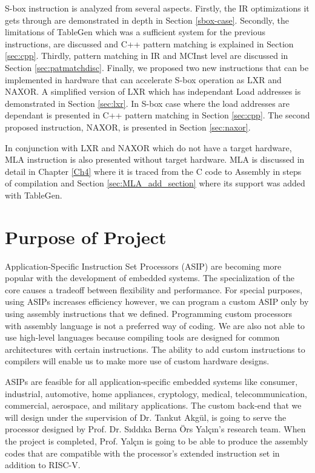 S-box instruction is analyzed from several aspects. Firstly, the IR optimizations it gets through are demonstrated in depth in Section \ref{sbox-case}. Secondly, the limitations of TableGen which was a sufficient system for the previous instructions, are discussed and C++ pattern matching is explained in Section \ref{sec:cpp}. 
Thirdly, pattern matching in IR and MCInst level are discussed in Section \ref{sec:patmatchdisc}. Finally, we proposed two new instructions that can be implemented in hardware that can accelerate S-box operation as LXR and NAXOR. A simplified version of LXR which has independant Load addresses is demonstrated in Section \ref{sec:lxr}. In S-box case where the load addresses are dependant is presented in C++ pattern matching in Section \ref{sec:cpp}. The second proposed instruction, NAXOR, is presented in Section \ref{sec:naxor}.

In conjunction with LXR and NAXOR which do not have a target hardware, MLA instruction is also presented without target hardware. MLA is discussed in detail in Chapter \ref{Ch4} where it is traced from the C code to Assembly in steps of compilation and Section \ref{sec:MLA_add_section} where its support was added with TableGen. 


\section{Purpose of Project}
Application-Specific Instruction Set Processors (ASIP) are becoming more popular with the development of embedded systems. The specialization of the core causes a tradeoff between flexibility and performance. For special purposes, using ASIPs increases efficiency however, we can program a custom ASIP only by using assembly instructions that we defined. Programming custom processors with assembly language is not a preferred way of coding. We are also not able to use high-level languages because compiling tools are designed for common architectures with certain instructions. The ability to add custom instructions to compilers will enable us to make more use of custom hardware designs.

ASIPs are feasible for all application-specific embedded systems like consumer, industrial, automotive, home appliances, cryptology, medical, telecommunication, commercial, aerospace, and military applications. The custom back-end that we will design under the supervision of Dr. Tankut Akgül, is going to serve the processor designed by Prof. Dr. Sıddıka Berna Örs Yalçın’s research team. When the project is completed, Prof. Yalçın is going to be able to produce the assembly codes that are compatible with the processor’s extended instruction set in addition to RISC-V.


